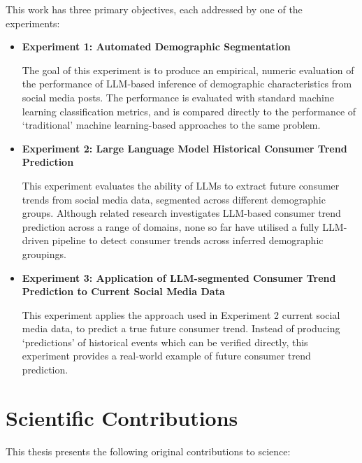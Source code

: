\documentclass{report}
\begin{document}
This work has three primary objectives, each addressed by one of the experiments:
\begin{itemize}
    \item \textbf{Experiment 1: Automated Demographic Segmentation}

    The goal of this experiment is to produce an empirical, numeric evaluation of the performance of LLM-based inference of demographic characteristics from social media posts. The performance is evaluated with standard machine learning classification metrics, and is compared directly to the performance of `traditional' machine learning-based approaches to the same problem.

    \item \textbf{Experiment 2: Large Language Model Historical Consumer Trend Prediction}

    This experiment evaluates the ability of LLMs to extract future consumer trends from social media data, segmented across different demographic groups. Although related research investigates LLM-based consumer trend prediction across a range of domains, none so far have utilised a fully LLM-driven pipeline to detect consumer trends across inferred demographic groupings.

    \item \textbf{Experiment 3: Application of LLM-segmented Consumer Trend Prediction to Current Social Media Data}

    This experiment applies the approach used in Experiment 2 current social media data, to predict a true future consumer trend. Instead of producing `predictions' of historical events which can be verified directly, this experiment provides a real-world example of future consumer trend prediction.
\end{itemize}


\section{Scientific Contributions}

This thesis presents the following original contributions to science:
\end{document}
